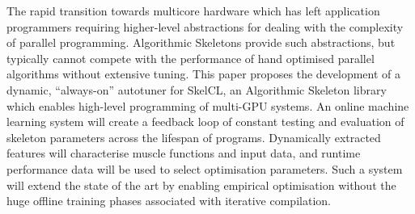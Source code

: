 The rapid transition towards multicore hardware which has left
application programmers requiring higher-level abstractions for
dealing with the complexity of parallel programming. Algorithmic
Skeletons provide such abstractions, but typically cannot compete with
the performance of hand optimised parallel algorithms without
extensive tuning. This paper proposes the development of a dynamic,
``always-on'' autotuner for SkelCL, an Algorithmic Skeleton library
which enables high-level programming of multi-GPU systems. An online
machine learning system will create a feedback loop of constant
testing and evaluation of skeleton parameters across the lifespan of
programs. Dynamically extracted features will characterise muscle
functions and input data, and runtime performance data will be used to
select optimisation parameters. Such a system will extend the state of
the art by enabling empirical optimisation without the huge offline
training phases associated with iterative compilation.
